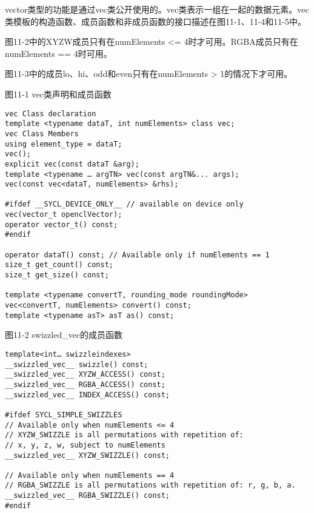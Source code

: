 vector类型的功能是通过vec类公开使用的。vec类表示一组在一起的数据元素。vec类模板的构造函数、成员函数和非成员函数的接口描述在图11-1、11-4和11-5中。\par

图11-2中的XYZW成员只有在numElements <= 4时才可用。RGBA成员只有在numElements == 4时可用。\par

图11-3中的成员lo、hi、odd和even只有在numElements > 1的情况下才可用。\par

\hspace*{\fill} \par %
图11-1 vec类声明和成员函数
\begin{lstlisting}[caption={}]
vec Class declaration
template <typename dataT, int numElements> class vec; 
vec Class Members 
using element_type = dataT; 
vec(); 
explicit vec(const dataT &arg); 
template <typename … argTN> vec(const argTN&... args); 
vec(const vec<dataT, numElements> &rhs); 

#ifdef __SYCL_DEVICE_ONLY__ // available on device only
vec(vector_t openclVector); 
operator vector_t() const; 
#endif

operator dataT() const; // Available only if numElements == 1 
size_t get_count() const; 
size_t get_size() const;

template <typename convertT, rounding_mode roundingMode> 
vec<convertT, numElements> convert() const; 
template <typename asT> asT as() const;
\end{lstlisting}

\hspace*{\fill} \par %
图11-2 swizzled\_vec的成员函数
\begin{lstlisting}[caption={}]
template<int… swizzleindexes>
__swizzled_vec__ swizzle() const; 
__swizzled_vec__ XYZW_ACCESS() const; 
__swizzled_vec__ RGBA_ACCESS() const; 
__swizzled_vec__ INDEX_ACCESS() const; 

#ifdef SYCL_SIMPLE_SWIZZLES
// Available only when numElements <= 4 
// XYZW_SWIZZLE is all permutations with repetition of: 
// x, y, z, w, subject to numElements
__swizzled_vec__ XYZW_SWIZZLE() const;

// Available only when numElements == 4 
// RGBA_SWIZZLE is all permutations with repetition of: r, g, b, a. 
__swizzled_vec__ RGBA_SWIZZLE() const; 
#endif
\end{lstlisting}

